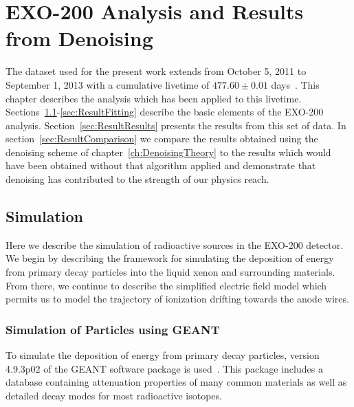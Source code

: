 \renewcommand{\thechapter}{7}
\chapter{EXO-200 Analysis and Results from Denoising}
\label{ch:DenoisingResults}

The dataset used for the present work extends from October 5, 2011 to September 1, 2013 with a cumulative livetime of $477.60 \pm 0.01$ days~\cite{NewEXObb0nPaper_2014}.  This chapter describes the analysis which has been applied to this livetime.  Sections~\ref{sec:ResultSimulation}-\ref{sec:ResultFitting} describe the basic elements of the EXO-200 analysis.  Section~\ref{sec:ResultResults} presents the results from this set of data.  In section~\ref{sec:ResultComparison} we compare the results obtained using the denoising scheme of chapter~\ref{ch:DenoisingTheory} to the results which would have been obtained without that algorithm applied and demonstrate that denoising has contributed to the strength of our physics reach.

\section{Simulation}\label{sec:ResultSimulation}

Here we describe the simulation of radioactive sources in the EXO-200 detector.  We begin by describing the framework for simulating the deposition of energy from primary decay particles into the liquid xenon and surrounding materials.  From there, we continue to describe the simplified electric field model which permits us to model the trajectory of ionization drifting towards the anode wires.

\subsection{Simulation of Particles using GEANT}

To simulate the deposition of energy from primary decay particles, version 4.9.3p02 of the GEANT software package is used~\cite{Agostinelli2003250,1610988}.  This package includes a database containing attenuation properties of many common materials as well as detailed decay modes for most radioactive isotopes.

